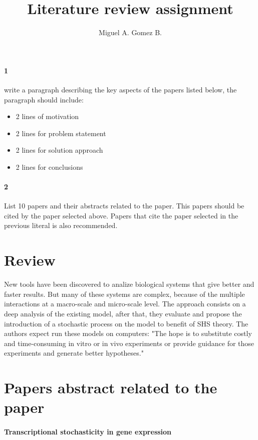 \documentclass{article}
\title{Literature review assignment}
\author{Miguel A. Gomez B.}
\begin{document}
	
\maketitle
\paragraph{1} write a paragraph describing the key aspects of the papers listed below, the
paragraph should include:
\begin{itemize}
	\item 2 lines of motivation
	\item 2 lines for problem statement
	\item 2 lines for solution approach
	\item 2 lines for conclusions
\end{itemize}
\paragraph{2} List 10 papers and their abstracts related to the paper. This papers should be cited by the
paper selected above. Papers that cite the paper selected in the previous literal is also
recommended.

\section{Review}

New tools have been discovered to analize biological systems that give better and faster results. But many of these systems are complex, because of the multiple interactions at a macro-scale and micro-scale level. The approach consists on a deep analysis of the existing model, after that, they evaluate and propose the introduction of a stochastic process on the model to benefit of SHS theory. The authors expect run these models on computers: "The hope is to substitute costly and time-consuming in vitro or in vivo experiments or provide guidance for those experiments and generate better hypotheses."\cite{xiangfang_li_review_2017:1}

\section{Papers abstract related to the paper}

\paragraph{Transcriptional stochasticity in gene expression\cite{tomasz_lipniacki_transcriptional_2006}}
\end{document}
